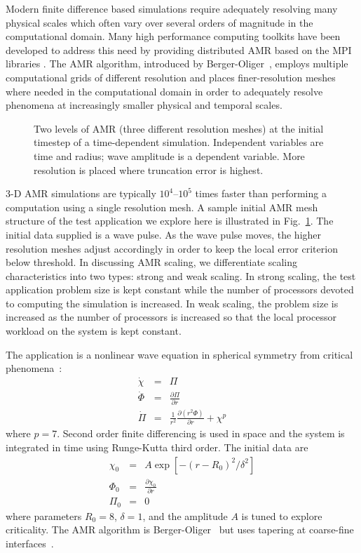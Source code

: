 \documentclass{revtex4}
\begin{document}
Modern finite difference based simulations require adequately
resolving many physical scales which often vary over several orders of
magnitude in the computational domain.  Many high performance
computing toolkits have been developed to address this need by
providing distributed AMR based on the MPI libraries \cite{Carpet, SAMRAI,had_webpage,Chombo,PAMR,Paramesh,AMROC}.  
The AMR algorithm, introduced by Berger-Oliger~\cite{Berger}, employs multiple computational grids of 
different resolution and places finer-resolution meshes where needed in the computational domain in order to 
adequately resolve phenomena at increasingly smaller physical and temporal scales.  

\begin{figure} \centering
{} \caption{\small{Two levels of AMR (three different resolution meshes) at the initial timestep of a time-dependent simulation.  Independent variables are time and radius; wave amplitude is a dependent variable.  More resolution is placed
where truncation error is highest.}
}
\label{fig:amr_example}
\end{figure}

3-D AMR simulations are typically $10^4$--$10^5$ times faster than performing a computation using a single 
resolution mesh.  A sample initial AMR mesh structure of the test application we explore here is 
illustrated in Fig.~\ref{fig:amr_example}.
The initial data supplied is a wave pulse.  As the wave pulse moves, the 
higher resolution meshes adjust accordingly in order to keep the local error criterion below
threshold.  In discussing AMR scaling, we differentiate scaling characteristics into two types: strong and weak scaling.  
In strong scaling, the test application problem size is kept constant while the number of processors 
devoted to computing the simulation is increased.  In weak scaling, the problem size is increased as the 
number of processors is increased so that the local processor workload on the system is kept constant.

The application is a nonlinear wave equation in spherical symmetry from critical phenomena~\cite{liebling}:
\begin{eqnarray}
\dot{\chi} &=& \Pi \label{eq:chi}  \\
\dot{\Phi} &=& \frac{\partial{\Pi}}{\partial{r}} \\
\dot{\Pi} &=& \frac{1}{r^2} \frac{\partial{\left(r^2 \Phi\right)}}{\partial r} + \chi^p 
\label{eq:critical}
\end{eqnarray}
where $p=7$.
Second order finite differencing is used in space and the system is integrated in time
using Runge-Kutta third order.  The initial data are  
\begin{eqnarray*}
\chi_0 &=& A \exp{\left[-(r-R_0)^2/\delta^2\right] } \\ 
\Phi_0 &=& \frac{\partial \chi_0}{\partial r} \\
\Pi_0 &=& 0
\end{eqnarray*}
where parameters $R_0=8$, $\delta=1$, and the amplitude $A$ is tuned to explore criticality.
The AMR algorithm is Berger-Oliger~\cite{Berger} but uses tapering at coarse-fine 
interfaces~\cite{Lehner:2005vc}.
\end{document}
